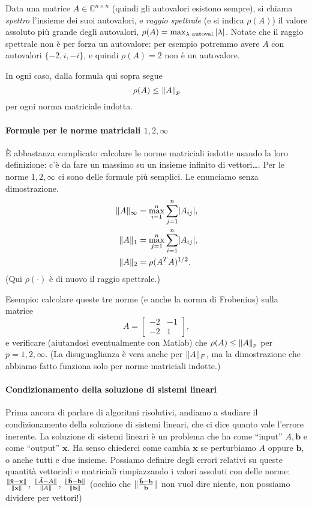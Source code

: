 \documentclass[a4paper]{report}
\DeclarePairedDelimiter{\abs}{\lvert}{\rvert}
\DeclarePairedDelimiter{\norm}{\lVert}{\rVert}
\theoremstyle{definiton}
\theoremstyle{remark}
\newcommand{\x}{\mathbf{x}}
\renewcommand{\b}{\mathbf{b}}
\begin{document}
Data una matrice $A \in \mathbb{C}^{n\times n}$ (quindi gli autovalori esistono sempre), si chiama \emph{spettro} l'insieme dei suoi autovalori, e \emph{raggio spettrale} (e si indica $\rho(A)$) il valore assoluto più grande degli autovalori, $\rho(A) = \max_{\lambda \text{ autoval.}} \abs{\lambda}$. Notate che il raggio spettrale non è per forza un autovalore: per esempio potremmo avere $A$ con autovalori $\{-2, i, -i\}$, e quindi $\rho(A)=2$ non è un autovalore.

In ogni caso, dalla formula qui sopra segue
\[
\rho(A) \leq \norm{A}_p
\]
per ogni norma matriciale indotta.

\paragraph{Formule per le norme matriciali $1,2,\infty$}
È abbastanza complicato calcolare le norme matriciali indotte usando la loro definizione: c'è da fare un massimo su un insieme infinito di vettori\dots. Per le norme $1,2,\infty$ ci sono delle formule più semplici. Le enunciamo senza dimostrazione.
\begin{align*}
\norm{A}_{\infty} &= \max_{i=1}^n \sum_{j=1}^n \abs{A_{ij}},\\
\norm{A}_{1} &= \max_{j=1}^n \sum_{i=1}^n \abs{A_{ij}},\\
\norm{A}_2 &= \rho(A^TA)^{1/2}.
\end{align*}
(Qui $\rho(\cdot)$ è di nuovo il raggio spettrale.)

Esempio: calcolare queste tre norme (e anche la norma di Frobenius) sulla matrice
\[
A = \begin{bmatrix}
    -2 & -1\\
    -2 & 1
\end{bmatrix},
\]
e verificare (aiutandosi eventualmente con Matlab) che $\rho(A)\leq \norm{A}_p$ per $p=1,2,\infty$. (La disuguaglianza è vera anche per $\norm{A}_F$, ma la dimostrazione che abbiamo fatto funziona solo per norme matriciali indotte.)

\paragraph{Condizionamento della soluzione di sistemi lineari} Prima ancora di parlare di algoritmi risolutivi, andiamo a studiare il condizionamento della soluzione di sistemi lineari, che ci dice quanto vale l'errore inerente. La soluzione di sistemi lineari è un problema che ha come ``input'' $A,\b$ e come ``output'' $\x$. Ha senso chiederci come cambia $\x$ se perturbiamo $A$ oppure $\b$, o anche tutti e due insieme. Possiamo definire degli errori relativi su queste quantità vettoriali e matriciali rimpiazzando i valori assoluti con delle norme: $\frac{\norm{\tilde{\x}-\x}}{\norm{\x}}$, $\frac{\norm{\tilde{A}-A}}{\norm{A}}$, $\frac{\norm{\tilde{\b}-\b}}{\norm{\b}}$ (occhio che $\norm{\frac{\tilde{\b}-\b}{\b}}$ non vuol dire niente, non possiamo dividere per vettori!)
\end{document}
